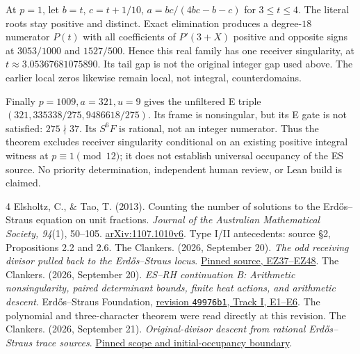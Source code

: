 \documentclass[11pt,reqno]{amsart}
\begin{document}
At $p=1$, let $b=t$, $c=t+1/10$, $a=bc/(4bc-b-c)$ for $3\le t\le4$.
The literal roots stay positive and distinct. Exact elimination produces a
degree-$18$ numerator $P(t)$ with all coefficients of $P'(3+X)$ positive and
opposite signs at $3053/1000$ and $1527/500$. Hence this real family has one
receiver singularity, at $t\approx3.05367681075890$. Its tail gap is not the
original integer gap used above. The earlier local zeros likewise remain local,
not integral, counterdomains.

Finally $p=1009,a=321,u=9$ gives the unfiltered E triple
$(321,335338/275,9486618/275)$. Its frame is nonsingular, but its E gate is
not satisfied: $275\nmid37$. Its $S^6F$ is rational, not an integer numerator.
Thus the theorem excludes receiver singularity conditional on an existing
positive integral witness at $p\equiv1\pmod{12}$; it does not establish
universal occupancy of the ES source. No priority determination, independent
human review, or Lean build is claimed.

\begin{thebibliography}{4}
 Elsholtz, C., \& Tao, T. (2013). Counting the number of solutions
to the Erd\H{o}s--Straus equation on unit fractions.
\emph{Journal of the Australian Mathematical Society, 94}(1), 50--105.
\href{https://arxiv.org/abs/1107.1010}{arXiv:1107.1010v6}.
Type I/II antecedents: source \S2, Propositions 2.2 and 2.6.
 The Clankers. (2026, September 20).
\emph{The odd receiving divisor pulled back to the Erd\H{o}s--Straus locus}.
\href{https://github.com/KokunoYumeto/erdos-straus-foundation/blob/49976b17491ba927df8bc7f2c2f81d39dfb15ce8/research/incoming/es-fable-zeta-bridge-20260920/ODD_RECEIVER_ES_PULLBACK.tex\#L19-L215}{Pinned source, EZ37--EZ48}.
 The Clankers. (2026, September 20).
\emph{ES--RH continuation B: Arithmetic nonsingularity, paired determinant
bounds, finite heat actions, and arithmetic descent}. Erd\H{o}s--Straus Foundation,
\href{https://github.com/KokunoYumeto/erdos-straus-foundation/blob/49976b17491ba927df8bc7f2c2f81d39dfb15ce8/research/incoming/es-rh-continuation-b-20260920/RESEARCH_CONTINUATION.md\#L44-L254}{revision \texttt{49976b1}, Track I, E1--E6}.
The polynomial and three-character theorem were read directly at this revision.
 The Clankers. (2026, September 21).
\emph{Original-divisor descent from rational Erd\H{o}s--Straus trace sources}.
\href{https://github.com/KokunoYumeto/erdos-straus-foundation/blob/1400e6301429cf9c66d8071e107be9dc41f5b907/research/incoming/es-turn07-divisor-descent-20260921/core.tex\#L1-L16}{Pinned scope and initial-occupancy boundary}.
\end{thebibliography}
\end{document}
